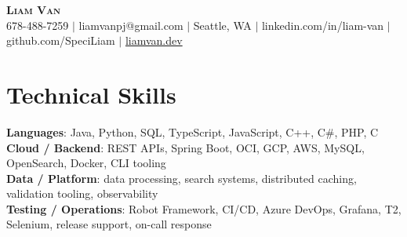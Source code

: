 \documentclass[letterpaper,11pt]{article}
\begin{document}

%
\begin{center}
    \textbf{\Huge \scshape Liam Van} \\ \vspace{1pt}
    \small 678-488-7259 $|$ \small {liamvanpj@gmail.com} $|$ Seattle, WA
 {{$|$ linkedin.com/in/liam-van} {$|$ github.com/SpeciLiam} {$|$ \href{https://liamvan.dev}{liamvan.dev}}}

\end{center}

\section{Technical Skills}
 \begin{itemize}[leftmargin=0.15in, label={}]
    \small{\item{
     \textbf{Languages}{: Java, Python, SQL, TypeScript, JavaScript, C++, C\#, PHP, C} \\
     \textbf{Cloud / Backend}{: REST APIs, Spring Boot, OCI, GCP, AWS, MySQL, OpenSearch, Docker, CLI tooling} \\
     \textbf{Data / Platform}{: data processing, search systems, distributed caching, validation tooling, observability} \\
     \textbf{Testing / Operations}{: Robot Framework, CI/CD, Azure DevOps, Grafana, T2, Selenium, release support, on-call response} \\
    }}
 \end{itemize}
%

\end{document}
